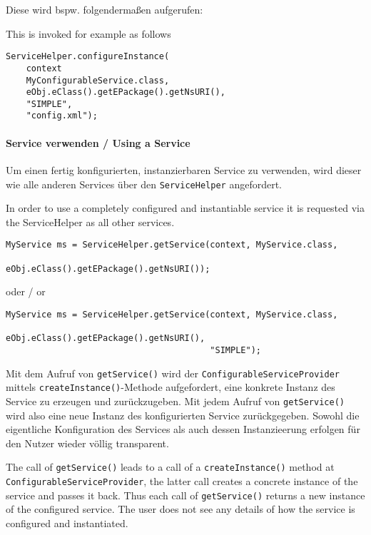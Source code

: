 \documentclass[10pt,a4paper]{scrartcl}
\providecommand{\deng}[2]{#1 / {\sffamily #2}}
\providecommand{\deutsch}[1]{#1}
\providecommand{\englisch}[1]{{\sffamily #1}}
\begin{document}
\deutsch{Diese wird bspw. folgendermaßen aufgerufen:}

\englisch{This is invoked for example as follows}

\begin{lstlisting}
ServiceHelper.configureInstance(
	context
	MyConfigurableService.class, 
	eObj.eClass().getEPackage().getNsURI(),
	"SIMPLE", 
    "config.xml");
\end{lstlisting}


\paragraph{\deng{Service verwenden}{Using a Service}}
\deutsch{Um einen fertig konfigurierten, instanzierbaren Service zu verwenden,
wird dieser wie alle anderen Services über den \texttt{ServiceHelper}
angefordert.}

\englisch{In order to use a completely configured and instantiable service it is
requested via the ServiceHelper as all other services.}

\begin{lstlisting}
MyService ms = ServiceHelper.getService(context, MyService.class, 
                                        eObj.eClass().getEPackage().getNsURI());
\end{lstlisting}
\deng{oder}{or}
\begin{lstlisting}
MyService ms = ServiceHelper.getService(context, MyService.class, 
                                        eObj.eClass().getEPackage().getNsURI(),
                                        "SIMPLE");
\end{lstlisting}

\deutsch{Mit dem Aufruf von \texttt{getService()} wird der
\texttt{ConfigurableServiceProvider} mittels \texttt{createInstance()}-Methode
aufgefordert, eine konkrete Instanz des Service zu erzeugen und zurückzugeben.
Mit jedem Aufruf von \texttt{getService()} wird also eine neue Instanz des
konfigurierten Service zurückgegeben. Sowohl die eigentliche Konfiguration des
Services als auch dessen Instanzieerung erfolgen für den Nutzer wieder völlig
transparent.}

\englisch{The call of \texttt{getService()} leads to a call of a
\texttt{createInstance()} method at \texttt{ConfigurableServiceProvider}, the
latter call creates a concrete instance of the service and passes it back. Thus
each call of \texttt{getService()} returns a new instance of the configured
service. The user does not see any details of how the service is configured and
instantiated.}
\end{document}
